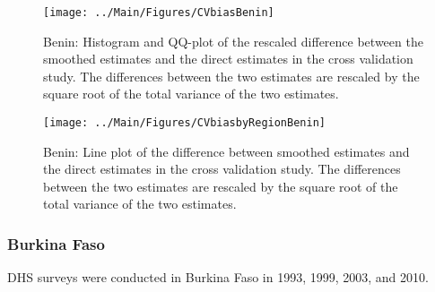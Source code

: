 \documentclass[12pt]{article}\usepackage[]{graphicx}\usepackage[]{color}
\newenvironment{knitrout}{}{} %
\begin{document}
\begin{knitrout}
\color{fgcolor}\begin{figure}[bht]

{\centering \texttt{[image: ../Main/Figures/CVbiasBenin]} 

}

\caption[Benin]{Benin: Histogram and QQ-plot of the rescaled difference between the smoothed estimates and the direct estimates in the cross validation study. The differences between the two estimates are rescaled by the square root of the total variance of the two estimates.}\label{fig:unnamed-chunk-19}
\end{figure}


\end{knitrout}

\begin{knitrout}
\color{fgcolor}\begin{figure}[bht]

{\centering \texttt{[image: ../Main/Figures/CVbiasbyRegionBenin]} 

}

\caption[Benin]{Benin: Line plot of the difference between smoothed estimates and the direct estimates in the cross validation study. The differences between the two estimates are rescaled by the square root of the total variance of the two estimates.}\label{fig:unnamed-chunk-20}
\end{figure}


\end{knitrout}

\clearpage
\subsubsection{Burkina Faso}





DHS surveys were conducted in Burkina Faso in 1993, 1999, 2003, and 2010.
\end{document}
